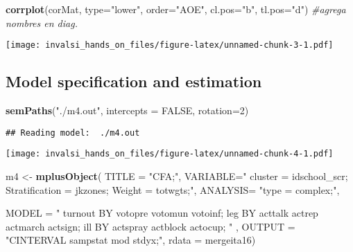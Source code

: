 \documentclass[
]{article}
\newenvironment{Shaded}{\begin{snugshade}}{\end{snugshade}}
\newcommand{\CommentTok}[1]{\textcolor[rgb]{0.56,0.35,0.01}{\textit{#1}}}
\newcommand{\DataTypeTok}[1]{\textcolor[rgb]{0.13,0.29,0.53}{#1}}
\newcommand{\DecValTok}[1]{\textcolor[rgb]{0.00,0.00,0.81}{#1}}
\newcommand{\KeywordTok}[1]{\textcolor[rgb]{0.13,0.29,0.53}{\textbf{#1}}}
\newcommand{\NormalTok}[1]{#1}
\newcommand{\OtherTok}[1]{\textcolor[rgb]{0.56,0.35,0.01}{#1}}
\newcommand{\StringTok}[1]{\textcolor[rgb]{0.31,0.60,0.02}{#1}}
\begin{document}
\begin{Shaded}
\begin{Highlighting}[]
\KeywordTok{corrplot}\NormalTok{(corMat, }\DataTypeTok{type=}\StringTok{"lower"}\NormalTok{,}
         \DataTypeTok{order=}\StringTok{"AOE"}\NormalTok{, }\DataTypeTok{cl.pos=}\StringTok{"b"}\NormalTok{, }\DataTypeTok{tl.pos=}\StringTok{"d"}\NormalTok{) }\CommentTok{#agrega nombres en diag.}
\end{Highlighting}
\end{Shaded}

\texttt{[image: invalsi\_hands\_on\_files/figure-latex/unnamed-chunk-3-1.pdf]}

\hypertarget{model-specification-and-estimation}{%
\subsection{Model specification and
estimation}\label{model-specification-and-estimation}}

\begin{Shaded}
\begin{Highlighting}[]
\KeywordTok{semPaths}\NormalTok{(}\StringTok{"./m4.out"}\NormalTok{, }\DataTypeTok{intercepts =} \OtherTok{FALSE}\NormalTok{, }\DataTypeTok{rotation=}\DecValTok{2}\NormalTok{)}
\end{Highlighting}
\end{Shaded}

\begin{verbatim}
## Reading model:  ./m4.out
\end{verbatim}

\texttt{[image: invalsi\_hands\_on\_files/figure-latex/unnamed-chunk-4-1.pdf]}

\begin{Shaded}
\begin{Highlighting}[]
\NormalTok{m4 <-}\StringTok{ }\KeywordTok{mplusObject}\NormalTok{(}
  \DataTypeTok{TITLE =} \StringTok{"CFA;"}\NormalTok{,}
  \DataTypeTok{VARIABLE=}\StringTok{" }
\StringTok{  cluster = idschool_scr;}
\StringTok{  Stratification = jkzones;}
\StringTok{  Weight = totwgts;"}\NormalTok{,}
  \DataTypeTok{ANALYSIS=}
    \StringTok{"type = complex;"}\NormalTok{,}
  
  \DataTypeTok{MODEL =} \StringTok{"}
\StringTok{   turnout BY votopre votomun votoinf;}
\StringTok{   leg BY acttalk actrep actmarch actsign;}
\StringTok{   ill BY actspray actblock actocup;}
\StringTok{  "}
\NormalTok{  ,}
  \DataTypeTok{OUTPUT =} \StringTok{"CINTERVAL sampstat mod stdyx;"}\NormalTok{,}
  \DataTypeTok{rdata =}\NormalTok{ mergeita16)}
\end{Highlighting}
\end{Shaded}
\end{document}
